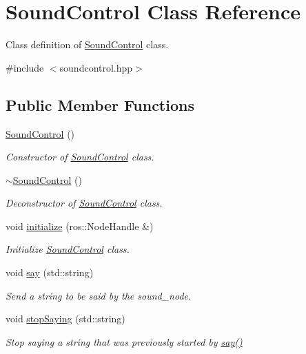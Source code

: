 \hypertarget{classSoundControl}{\section{Sound\-Control Class Reference}
\label{classSoundControl}
}


Class definition of \hyperlink{classSoundControl}{Sound\-Control} class.  




{\ttfamily \#include $<$soundcontrol.\-hpp$>$}

\subsection*{Public Member Functions}
\begin{DoxyCompactItemize}
\item 
\hyperlink{classSoundControl_ad48c17386cb800e8413997c313a38bb8}{Sound\-Control} ()
\begin{DoxyCompactList}\small\item\em Constructor of \hyperlink{classSoundControl}{Sound\-Control} class. \end{DoxyCompactList}\item 
\hyperlink{classSoundControl_ae36289abf3de9f18452fb59bed71a4d3}{$\sim$\-Sound\-Control} ()
\begin{DoxyCompactList}\small\item\em Deconstructor of \hyperlink{classSoundControl}{Sound\-Control} class. \end{DoxyCompactList}\item 
void \hyperlink{classSoundControl_a37fa780f0ad8d88f7f8acd6c401f982a}{initialize} (ros\-::\-Node\-Handle \&)
\begin{DoxyCompactList}\small\item\em Initialize \hyperlink{classSoundControl}{Sound\-Control} class. \end{DoxyCompactList}\item 
void \hyperlink{classSoundControl_af4f08053a3f8761033891aa31634b2cf}{say} (std\-::string)
\begin{DoxyCompactList}\small\item\em Send a string to be said by the sound\-\_\-node. \end{DoxyCompactList}\item 
void \hyperlink{classSoundControl_a7229f0bbed5c5e3f8ceeaff53e7ea456}{stop\-Saying} (std\-::string)
\begin{DoxyCompactList}\small\item\em Stop saying a string that was previously started by \hyperlink{classSoundControl_af4f08053a3f8761033891aa31634b2cf}{say()} \end{DoxyCompactList}\item 

\end{DoxyCompactItemize}
